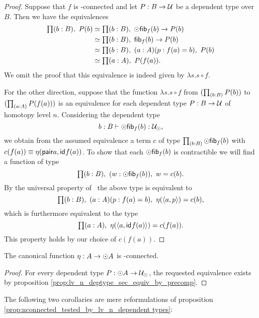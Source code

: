 \begin{proof}
Suppose that $f$ is \modal-connected and let $P:B\to\mathcal{U}$ be a dependent type over $B$. Then we have the equivalences
\begin{align*}
\prd{b:B} P(b) & \simeq \prd{b:B} \modal\hfib{f}b\to P(b)\\
& \simeq \prd{b:B} \hfib{f}b\to P(b)\\
& \simeq \prd{b:B}(a:A)(p:f(a)= b),\ P(b)\\
& \simeq \prd{a:A} P(f(a)).
\end{align*}
We omit the proof that this equivalence is indeed given by $\lambda s.s\circ f$. 

For the other direction, suppose that the function $\lambda s.s\circ f$ from $(\prd{b:B} P(b))$ to $(\prd{a:A} P(f(a)))$ is an
equivalence for each dependent type $P:B\to\mathcal{U}$ of homotopy level $n$. Considering the dependent type 
\begin{equation*}
b:B\vdash\odot\mathsf{fib}_{f}(b):\mathcal{U}_{\odot},
\end{equation*}
we obtain from the assumed equivalence a term $c$ of type $\prd{b:B} \modal\hfib{f}b$ with
$c(f(a))\equiv\eta(\mathsf{pair}{a,\mathsf{id}_{}{f(a)}})$. To show that each $\odot\mathsf{fib}_{f}(b)$ is contractible 
we will find a function of type
\begin{equation*}
\prd{b:B}(w:\modal\hfib{f}b),\ w= c(b).
\end{equation*}
By the universal property of \modal\ the above type is equivalent to
\begin{equation*}
\prd{b:B}(a:A)(p:f(a)= b),\ \mreturn(\pairr{a,p})= c(b),
\end{equation*}
which is furthermore equivalent to the type
\begin{equation*}
\prd{a:A} \mreturn(\pairr{a,\idfunc{f(a)}})= c(f(a)).
\end{equation*}
This property holds by our choice of $c(f(a))$. 
\end{proof}

\begin{cor}\label{cor:totrunc_is_connected}
The canonical function $\eta:A\to\odot A$ is \modal-connected.
\end{cor}

\begin{proof}
For every dependent type $P:\odot A\to\mathcal{U}_{\odot}$, the requested equivalence exists by proposition
\ref{prop:lv_n_deptype_sec_equiv_by_precomp}.
\end{proof}

The following two corollaries are mere reformulations of proposition \ref{prop:nconnected_tested_by_lv_n_dependent types}:

